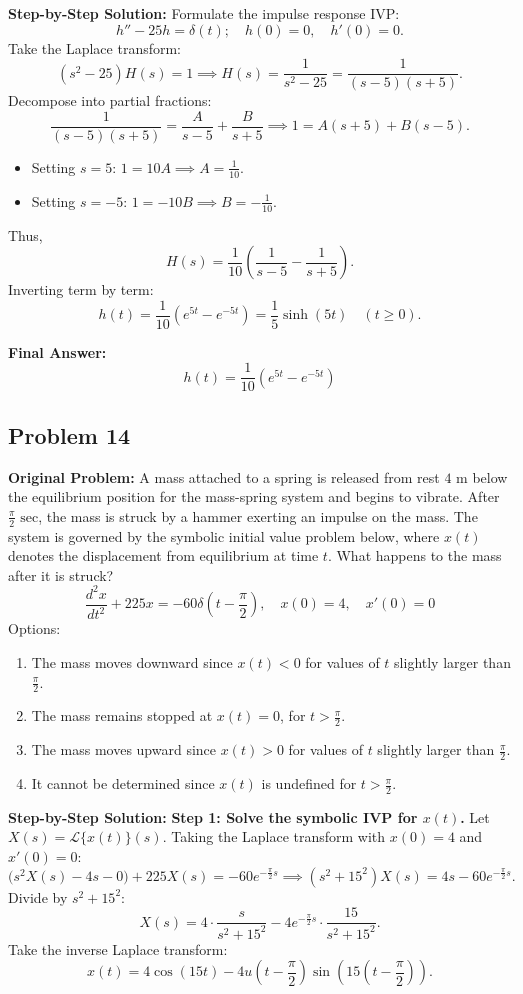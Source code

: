\documentclass[11pt, letterpaper]{article}
\theoremstyle{definition}
\theoremstyle{remark}
\begin{document}
\textbf{Step-by-Step Solution:}
Formulate the impulse response IVP:
\[
    h'' - 25h = \delta(t); \quad h(0) = 0,\quad h'(0) = 0.
\]
Take the Laplace transform:
\[
    (s^2 - 25)H(s) = 1 \implies H(s) = \frac{1}{s^2 - 25} = \frac{1}{(s - 5)(s + 5)}.
\]
Decompose into partial fractions:
\[
    \frac{1}{(s - 5)(s + 5)} = \frac{A}{s - 5} + \frac{B}{s + 5} \implies 1 = A(s + 5) + B(s - 5).
\]
\begin{itemize}
    \item Setting $s = 5$: $1 = 10A \implies A = \frac{1}{10}$.
    \item Setting $s = -5$: $1 = -10B \implies B = -\frac{1}{10}$.
\end{itemize}
Thus,
\[
    H(s) = \frac{1}{10}\left(\frac{1}{s - 5} - \frac{1}{s + 5}\right).
\]
Inverting term by term:
\[
    h(t) = \frac{1}{10}\left(e^{5t} - e^{-5t}\right) = \frac{1}{5}\sinh(5t) \quad (t \ge 0).
\]

\textbf{Final Answer:}
\[
    h(t) = \frac{1}{10}\left(e^{5t} - e^{-5t}\right)
\]

\subsection{Problem 14}
\textbf{Original Problem:}
A mass attached to a spring is released from rest $4\text{ m}$ below the equilibrium position for the mass-spring system and begins to vibrate. After $\frac{\pi}{2}\text{ sec}$, the mass is struck by a hammer exerting an impulse on the mass. The system is governed by the symbolic initial value problem below, where $x(t)$ denotes the displacement from equilibrium at time $t$. What happens to the mass after it is struck?
\[
    \frac{d^2 x}{dt^2} + 225x = -60\delta\left(t - \frac{\pi}{2}\right), \quad x(0) = 4,\quad x'(0) = 0
\]
Options:
\begin{enumerate}[label=\Alph*.]
    \item The mass moves downward since $x(t) < 0$ for values of $t$ slightly larger than $\frac{\pi}{2}$.
    \item The mass remains stopped at $x(t) = 0$, for $t > \frac{\pi}{2}$.
    \item The mass moves upward since $x(t) > 0$ for values of $t$ slightly larger than $\frac{\pi}{2}$.
    \item It cannot be determined since $x(t)$ is undefined for $t > \frac{\pi}{2}$.
\end{enumerate}

\textbf{Step-by-Step Solution:}
\textbf{Step 1: Solve the symbolic IVP for $x(t)$.}
Let $X(s) = \mathcal{L}\{x(t)\}(s)$. Taking the Laplace transform with $x(0) = 4$ and $x'(0) = 0$:
\[
    \bigl(s^2 X(s) - 4s - 0\bigr) + 225 X(s) = -60 e^{-\frac{\pi}{2}s} \implies (s^2 + 15^2)X(s) = 4s - 60 e^{-\frac{\pi}{2}s}.
\]
Divide by $s^2 + 15^2$:
\[
    X(s) = 4\cdot\frac{s}{s^2 + 15^2} - 4e^{-\frac{\pi}{2}s}\cdot\frac{15}{s^2 + 15^2}.
\]
Take the inverse Laplace transform:
\[
    x(t) = 4\cos(15t) - 4u\left(t - \frac{\pi}{2}\right)\sin\left(15\left(t - \frac{\pi}{2}\right)\right).
\]
\end{document}
